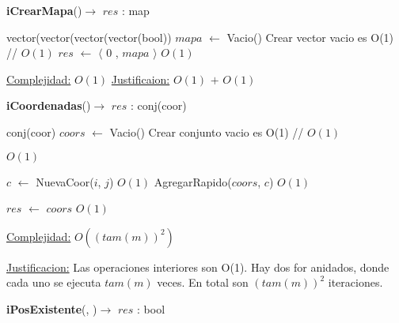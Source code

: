 \begin{Algoritmos}


\begin{algorithm}[H]
{\textbf{iCrearMapa}()$\to$ $res$ : map}
\begin{algorithmic}[1]
   
\State vector(vector(vector(vector(bool)) $mapa$ $\gets$ Vacio()    \Comment Crear vector vacio es O(1) // $O(1)$
\State $res$ $\gets$  $\langle$ 0 , $mapa$ $\rangle$   \Comment $O(1)$

\medskip
\Statex \underline{Complejidad:} $O(1)$
\State \underline{Justificaion:} $O(1)$ $+$ $O(1)$

\end{algorithmic}
\end{algorithm}

\begin{algorithm}[H]
{\textbf{iCoordenadas}()$\to$ $res$ : conj(coor)}
\begin{algorithmic}[1]
   

\State conj(coor) $coors$ $\gets$ Vacio()      \Comment Crear conjunto vacio es O(1) // $O(1)$

	
		
		  \Comment $O(1)$
			
			\State $c$ $\gets$ NuevaCoor($i$, $j$)   \Comment $O(1)$			
			\State AgregarRapido($coors$, $c$)   \Comment $O(1)$			
			
		\EndIf
		
	\EndFor

\EndFor

\State $res$ $\gets$ $coors$ \Comment $O(1)$


\medskip
\Statex \underline{Complejidad:} $O((tam(m))^2)$

\Statex \underline{Justificacion:} Las operaciones interiores son O(1). Hay dos for anidados, donde cada uno se ejecuta $tam(m)$ veces. En total son $(tam(m))^2$ iteraciones. 

\end{algorithmic}
\end{algorithm}


\begin{algorithm}[H]
{\textbf{iPosExistente}(, )$\to$ $res$ : bool}
\begin{algorithmic}[1]
   

\end{algorithmic}
\end{algorithm}
\end{Algoritmos}
